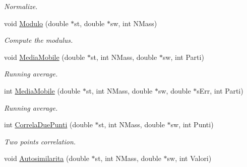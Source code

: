 \begin{DoxyCompactItemize}
\begin{DoxyCompactList}\small\item\em Normalize. \end{DoxyCompactList}\item 
void \hyperlink{classMatematica_a4e641eb6229cee6b8fb5674433fc2da5}{Modulo} (double $\ast$st, double $\ast$sw, int N\+Mass)\hypertarget{classMatematica_a4e641eb6229cee6b8fb5674433fc2da5}{}\label{classMatematica_a4e641eb6229cee6b8fb5674433fc2da5}

\begin{DoxyCompactList}\small\item\em Compute the modulus. \end{DoxyCompactList}\item 
void \hyperlink{classMatematica_a99d5aa828752a12f2c5bc2033e00d0ad}{Media\+Mobile} (double $\ast$st, int N\+Mass, double $\ast$sw, int Parti)\hypertarget{classMatematica_a99d5aa828752a12f2c5bc2033e00d0ad}{}\label{classMatematica_a99d5aa828752a12f2c5bc2033e00d0ad}

\begin{DoxyCompactList}\small\item\em Running average. \end{DoxyCompactList}\item 
int \hyperlink{classMatematica_a0529a1c2450d94429ff81273ce35cd42}{Media\+Mobile} (double $\ast$st, int N\+Mass, double $\ast$sw, double $\ast$s\+Err, int Parti)\hypertarget{classMatematica_a0529a1c2450d94429ff81273ce35cd42}{}\label{classMatematica_a0529a1c2450d94429ff81273ce35cd42}

\begin{DoxyCompactList}\small\item\em Running average. \end{DoxyCompactList}\item 
int \hyperlink{classMatematica_acc472956dae6f7628bad8d4ca7f7ed68}{Correla\+Due\+Punti} (double $\ast$st, int N\+Mass, double $\ast$sw, int Punti)\hypertarget{classMatematica_acc472956dae6f7628bad8d4ca7f7ed68}{}\label{classMatematica_acc472956dae6f7628bad8d4ca7f7ed68}

\begin{DoxyCompactList}\small\item\em Two points correlation. \end{DoxyCompactList}\item 
void \hyperlink{classMatematica_ac6fad3beb60e7a8d3b35e40a1eb98fb3}{Autosimilarita} (double $\ast$st, int N\+Mass, double $\ast$sw, int Valori)\hypertarget{classMatematica_ac6fad3beb60e7a8d3b35e40a1eb98fb3}{}\label{classMatematica_ac6fad3beb60e7a8d3b35e40a1eb98fb3}


\end{DoxyCompactItemize}

